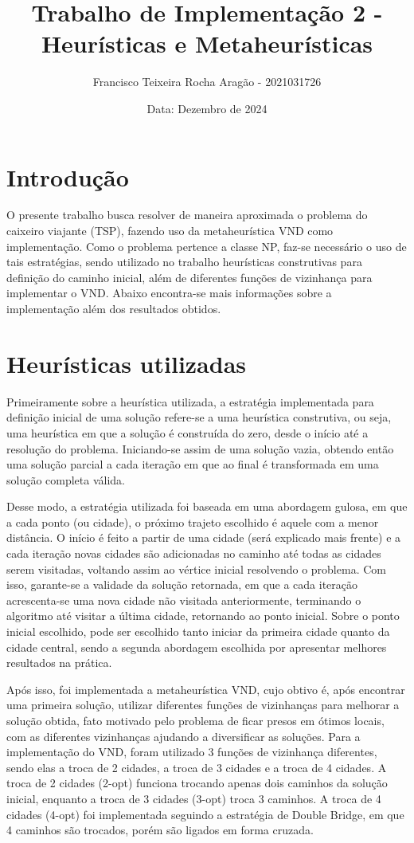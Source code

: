\documentclass[10pt]{extarticle} %
\title{Trabalho de Implementação 2 - Heurísticas e Metaheurísticas}
\author{Francisco Teixeira Rocha Aragão - 2021031726}
\date{Data: Dezembro de 2024}
\begin{document}
\maketitle

\section{Introdução}

O presente trabalho busca resolver de maneira aproximada o problema do caixeiro viajante (TSP), fazendo uso da metaheurística VND como implementação. Como o problema pertence a classe NP, faz-se necessário o uso de tais estratégias, sendo utilizado no trabalho heurísticas construtivas para definição do caminho inicial, além de diferentes funções de vizinhança para implementar o VND. Abaixo encontra-se mais informações sobre a implementação além dos resultados obtidos.

\section{Heurísticas utilizadas}

Primeiramente sobre a heurística utilizada, a estratégia implementada para definição inicial de uma solução refere-se a uma heurística construtiva, ou seja, uma heurística em que a solução é construída do zero, desde o início até a resolução do problema. Iniciando-se assim de uma solução vazia, obtendo então uma solução parcial a cada iteração em que ao final é transformada em uma solução completa válida.

Desse modo, a estratégia utilizada foi baseada em uma abordagem gulosa, em que a cada ponto (ou cidade), o próximo trajeto escolhido é aquele com a menor distância. O início é feito a partir de uma cidade (será explicado mais frente) e a cada iteração novas cidades são adicionadas no caminho até todas as cidades serem visitadas, voltando assim ao vértice inicial resolvendo o problema. Com isso, garante-se a validade da solução retornada, em que a cada iteração acrescenta-se uma nova cidade não visitada anteriormente, terminando o algoritmo até visitar a última cidade, retornando ao ponto inicial. Sobre o ponto inicial escolhido, pode ser escolhido tanto iniciar da primeira cidade quanto da cidade central, sendo a segunda abordagem escolhida por apresentar melhores resultados na prática.

Após isso, foi implementada a metaheurística VND, cujo obtivo é, após encontrar uma primeira solução, utilizar diferentes funções de vizinhanças para melhorar a solução obtida, fato motivado pelo problema de ficar presos em ótimos locais, com as diferentes vizinhanças ajudando a diversificar as soluções. Para a implementação do VND, foram utilizado 3 funções de vizinhança diferentes, sendo elas a troca de 2 cidades, a troca de 3 cidades e a troca de 4 cidades. A troca de 2 cidades (2-opt) funciona trocando apenas dois caminhos da solução inicial, enquanto a troca de 3 cidades (3-opt) troca 3 caminhos. A troca de 4 cidades (4-opt) foi implementada seguindo a estratégia de Double Bridge, em que 4 caminhos são trocados, porém são ligados em forma cruzada.
\end{document}
